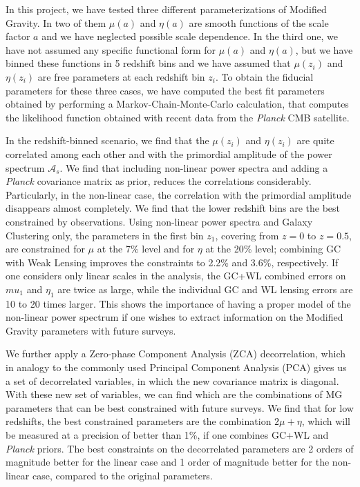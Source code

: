 In this project, we have tested three different parameterizations of Modified Gravity.
In two of them $\mu(a)$ and $\eta(a)$  are smooth functions of the scale
factor $a$ and we have neglected possible scale dependence. In the third one, we have not assumed any specific functional form for $\mu(a)$ and $\eta(a)$,
but we have binned these functions in 5 redshift bins and we have assumed that $\mu(z_i)$ and $\eta(z_i)$ 
are free parameters at each redshift bin $z_i$.
To obtain the fiducial parameters for these three cases, we have computed the best fit parameters obtained by
performing a Markov-Chain-Monte-Carlo calculation, that computes the likelihood function obtained with recent data from the \textit{Planck} CMB satellite.

In the redshift-binned scenario, we find that the $\mu(z_i)$ and $\eta(z_i)$ are quite correlated among each other and
with the primordial amplitude of the power spectrum $\mathcal{A}_s$. We find that including non-linear power spectra and adding
a \textit{Planck} covariance matrix as prior, reduces the correlations considerably. Particularly, in the non-linear case, the correlation
with the primordial amplitude disappears almost completely. We find that the lower redshift bins are the best constrained
by observations. 
Using non-linear power spectra and Galaxy Clustering only,
the parameters in the first bin $z_1$, covering from $z=0$ to $z=0.5$, are constrained for $\mu$ at the 
7\% level and for $\eta$ at the 20\% level; combining GC with Weak Lensing improves the constraints 
to 2.2\% and 3.6\%, respectively. If one considers only linear scales in the analysis,
the GC+WL combined errors on $mu_1$ and $\eta_1$ are twice as large, while the individual GC
and WL lensing errors are 10 to 20 times larger.
This shows the importance of having a proper model of the non-linear power spectrum if one wishes to extract information
on the Modified Gravity parameters with future surveys.

We further apply a Zero-phase Component Analysis (ZCA) decorrelation, which in analogy to the commonly used
Principal Component Analysis (PCA) gives us a set of decorrelated variables, in which the new covariance matrix is diagonal.
With these new set of variables, we can find which are the combinations of MG parameters that can be best constrained with future surveys.
We find that for low redshifts, the best constrained parameters are the combination $2\mu + \eta$, which will be measured at a precision of better
than 1\%, if one combines GC+WL and \textit{Planck} priors. The best constraints on the decorrelated parameters are 2 orders of magnitude better
for the linear case and 1 order of magnitude better for the non-linear case, compared to the original parameters.

